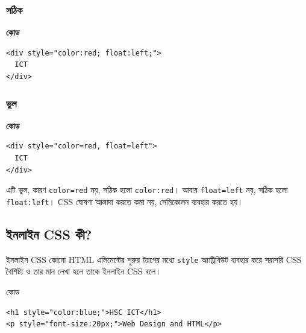 \par\noindent
\begin{minipage}[t]{.54\linewidth}\vspace{0pt}\small
\subsubsection{সঠিক}

\textbf{\color{chFourTeal}কোড}\par
\begin{verbatim}
<div style="color:red; float:left;">
  ICT
</div>
\end{verbatim}

\par\smallskip
\end{minipage}\hfill
\begin{minipage}[t]{.42\linewidth}\vspace{0pt}\small
\subsubsection{ভুল}

\textbf{\color{chFourTeal}কোড}\par
\begin{verbatim}
<div style="color=red, float=left">
  ICT
</div>
\end{verbatim}

\par\smallskip


এটি ভুল, কারণ \texttt{color=red} নয়, সঠিক হলো \texttt{color:red}। আবার \texttt{float=left} নয়, সঠিক হলো \texttt{float:left}। CSS ঘোষণা আলাদা করতে কমা নয়, সেমিকোলন ব্যবহার করতে হয়।
\end{minipage}\par
\subsection{ইনলাইন CSS কী?}

\begin{definitionbox}{ইনলাইন CSS}
কোনো HTML এলিমেন্টের শুরুর ট্যাগের মধ্যে \texttt{style} অ্যাট্রিবিউট ব্যবহার করে সরাসরি CSS বৈশিষ্ট্য ও তার মান লেখা হলে তাকে ইনলাইন CSS বলে।
\end{definitionbox}

\begin{examplebox}{কোড}
\par\noindent\begin{minipage}{\linewidth}
\begin{verbatim}
<h1 style="color:blue;">HSC ICT</h1>
<p style="font-size:20px;">Web Design and HTML</p>
\end{verbatim}
\end{minipage}\par
\end{examplebox}

